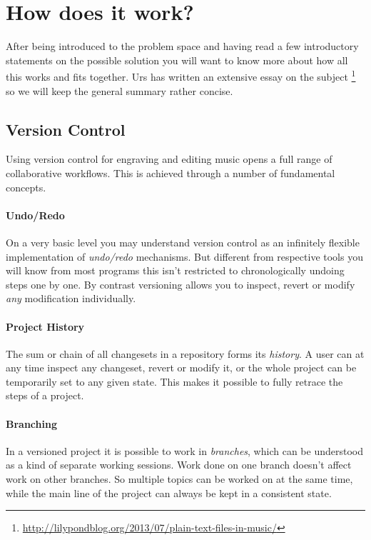 \documentclass[11pt,a4paper]{article}
\begin{document}
\section{How does it work?}
After being introduced to the problem space and having read a few introductory statements 
on the possible solution you will want to know more about how all this works and fits
together. Urs has written an extensive essay on the subject%
\footnote{\url{http://lilypondblog.org/2013/07/plain-text-files-in-music/}}
so we will keep the general summary rather concise.

\subsection{Version Control}
Using version control for engraving and editing music opens a full range of collaborative
workflows. This is achieved through a number of fundamental concepts.

\paragraph{Undo/Redo}
On a very basic level you may understand version control as an infinitely flexible
implementation of \emph{undo/redo} mechanisms. But different from respective tools you will
know from most programs this isn't restricted to chronologically undoing steps one by
one. By contrast versioning allows you to inspect, revert or modify \emph{any} modification
individually.

\paragraph{Project History}
The sum or chain of all changesets in a repository forms its \emph{history}. A user can 
at any time inspect any changeset, revert or modify it, or the whole project can be
temporarily set to any given state. This makes it possible to fully retrace the steps
of a project.

\paragraph{Branching}
In a versioned project it is possible to work in \emph{branches}, which can be
understood as a kind of separate working sessions. Work done on one branch doesn't affect
work on other branches. So multiple topics can be worked on at the same time, while
the main line of the project can always be kept in a consistent state.
\end{document}

